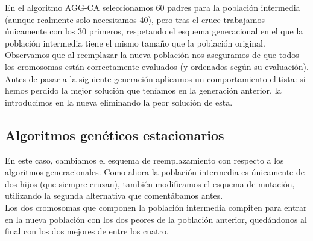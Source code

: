 \documentclass[12pt]{article}
\begin{document}
En el algoritmo AGG-CA seleccionamos $60$ padres para la población intermedia (aunque realmente solo necesitamos 40), pero tras el cruce trabajamos únicamente con los $30$ primeros, respetando el esquema generacional en el que la población intermedia tiene el mismo tamaño que la población original.\\

Observamos que al reemplazar la nueva población nos aseguramos de que todos los cromosomas están correctamente evaluados (y ordenados según su evaluación). Antes de pasar a la siguiente generación aplicamos un comportamiento elitista: si hemos perdido la mejor solución que teníamos en la generación anterior, la introducimos en la nueva eliminando la peor solución de esta.

\subsection*{Algoritmos genéticos estacionarios}
\label{age}

En este caso, cambiamos el esquema de reemplazamiento con respecto a los algoritmos generacionales. Como ahora la población intermedia es únicamente de dos hijos (que siempre cruzan), también modificamos el esquema de mutación, utilizando la segunda alternativa que comentábamos antes.\\

Los dos cromosomas que componen la población intermedia compiten para entrar en la nueva población con los dos peores de la población anterior, quedándonos al final con los dos mejores de entre los cuatro.

\newpage
\end{document}
